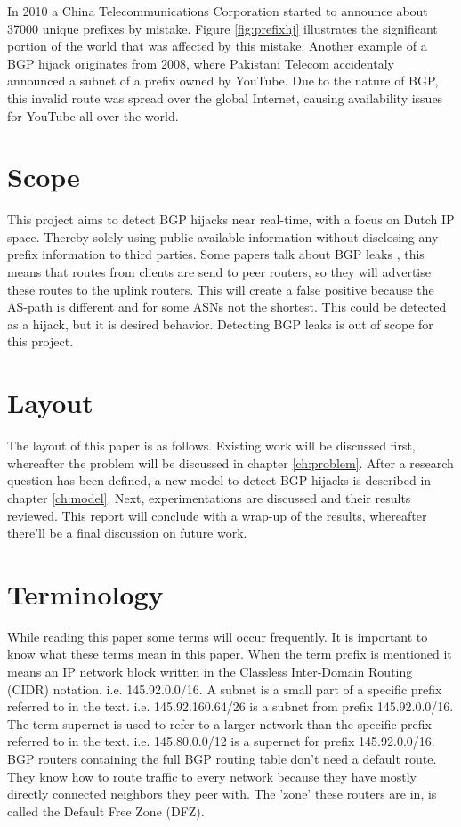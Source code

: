 In 2010 a China Telecommunications Corporation started to announce about 37000 unique prefixes by mistake\cite{prefixhj}. Figure \ref{fig:prefixhj} illustrates the significant portion of the world that was affected by this mistake. Another example of a BGP hijack originates from 2008, where Pakistani Telecom accidentaly announced a subnet of a prefix owned by YouTube. Due to the nature of BGP, this invalid route was spread over the global Internet, causing availability issues for YouTube all over the world\cite{youtubehack}.\par

\section{Scope}\label{sec:scope}
This project aims to detect BGP hijacks near real-time, with a focus on Dutch IP space. Thereby solely using public available information without disclosing any prefix information to third parties. Some papers talk about BGP leaks \cite{hu2007accurate}, this means that routes from clients are send to peer routers, so they will advertise these routes to the uplink routers. This will create a false positive because the AS-path is different and for some ASNs not the shortest. This could be detected as a hijack, but it is desired behavior. Detecting BGP leaks is out of scope for this project.

\section{Layout}\label{sec:layout}
The layout of this paper is as follows. Existing work will be discussed first, whereafter the problem will be discussed in chapter \ref{ch:problem}. After a research question has been defined, a new model to detect BGP hijacks is described in chapter \ref{ch:model}. Next, experimentations are discussed and their results reviewed. This report will conclude with a wrap-up of the results, whereafter there'll be a final discussion on future work.

\section{Terminology}\label{sec:terminology}
While reading this paper some terms will occur frequently. It is important to know what these terms mean in this paper. When the term prefix is mentioned it means an IP network block written in the Classless Inter-Domain Routing (CIDR) notation. i.e. 145.92.0.0/16. A subnet is a small part of a specific prefix referred to in the text. i.e. 145.92.160.64/26 is a subnet from prefix 145.92.0.0/16. The term supernet is used to refer to a larger network than the specific prefix referred to in the text. i.e. 145.80.0.0/12 is a supernet for prefix 145.92.0.0/16. BGP routers containing the full BGP routing table don't need a default route. They know how to route traffic to every network because they have mostly directly connected neighbors they peer with. The 'zone' these routers are in, is called the Default Free Zone (DFZ). 
